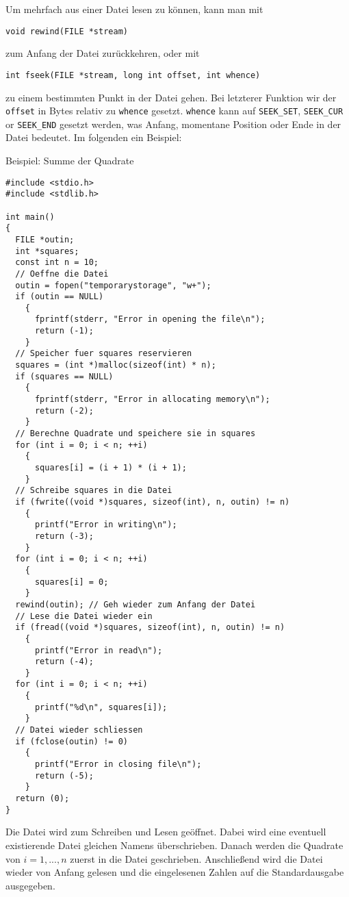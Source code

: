 Um mehrfach aus einer Datei lesen zu können, kann man mit
\begin{lstlisting}
void rewind(FILE *stream)
\end{lstlisting}
zum Anfang der Datei zurückkehren, oder mit
\begin{lstlisting}
int fseek(FILE *stream, long int offset, int whence)
\end{lstlisting}
zu einem bestimmten Punkt in der Datei gehen.
Bei letzterer Funktion wir der \verb|offset| in Bytes relativ zu \verb|whence| gesetzt.
\verb|whence| kann auf \verb|SEEK_SET|, \verb|SEEK_CUR| or \verb|SEEK_END| gesetzt werden, was Anfang, momentane Position oder Ende in der Datei bedeutet.
Im folgenden ein Beispiel:
\begin{myexampleprogram}{Beispiel: Summe der Quadrate}
\begin{lstlisting}
#include <stdio.h>
#include <stdlib.h>

int main()
{
  FILE *outin;
  int *squares;
  const int n = 10;
  // Oeffne die Datei
  outin = fopen("temporarystorage", "w+");
  if (outin == NULL)
    {
      fprintf(stderr, "Error in opening the file\n");
      return (-1);
    }
  // Speicher fuer squares reservieren
  squares = (int *)malloc(sizeof(int) * n);
  if (squares == NULL)
    {
      fprintf(stderr, "Error in allocating memory\n");
      return (-2);
    }
  // Berechne Quadrate und speichere sie in squares
  for (int i = 0; i < n; ++i)
    {
      squares[i] = (i + 1) * (i + 1);
    }
  // Schreibe squares in die Datei
  if (fwrite((void *)squares, sizeof(int), n, outin) != n)
    {
      printf("Error in writing\n");
      return (-3);
    }
  for (int i = 0; i < n; ++i)
    {
      squares[i] = 0;
    }
  rewind(outin); // Geh wieder zum Anfang der Datei
  // Lese die Datei wieder ein
  if (fread((void *)squares, sizeof(int), n, outin) != n)
    {
      printf("Error in read\n");
      return (-4);
    }
  for (int i = 0; i < n; ++i)
    {
      printf("%d\n", squares[i]);
    }
  // Datei wieder schliessen
  if (fclose(outin) != 0)
    {
      printf("Error in closing file\n");
      return (-5);
    }
  return (0);
}
\end{lstlisting}
\end{myexampleprogram}
Die Datei wird zum Schreiben und Lesen geöffnet.
Dabei wird eine eventuell existierende Datei gleichen Namens überschrieben.
Danach werden die Quadrate von $i=1,...,n$ zuerst in die Datei geschrieben.
Anschließend wird die Datei wieder von Anfang gelesen und die eingelesenen Zahlen auf die Standardausgabe ausgegeben.
